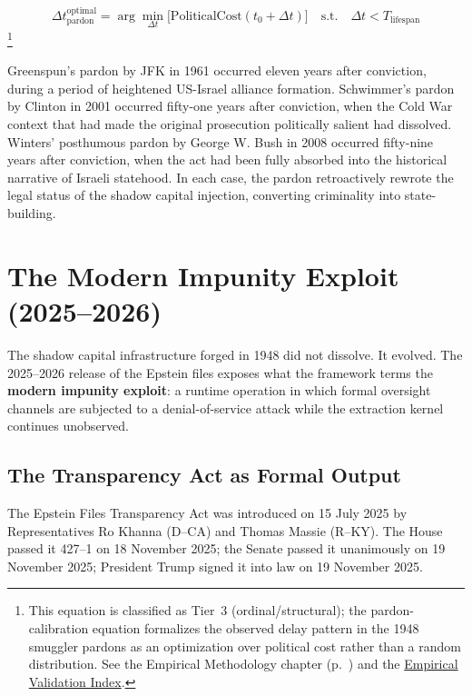 \begin{equation}\label{eq:gp8b-pardon-calibration}
\Delta t_{\text{pardon}}^{\text{optimal}} = \arg\min_{\Delta t} \bigl[ \text{PoliticalCost}(t_0 + \Delta t) \bigr] \quad \text{s.t.} \quad \Delta t < T_{\text{lifespan}}
\end{equation}
\footnote{This equation is classified as Tier~3 (ordinal/structural); the pardon-calibration equation formalizes the observed delay pattern in the 1948 smuggler pardons as an optimization over political cost rather than a random distribution. See the Empirical Methodology chapter (p.~\pageref{ch:empirical_methodology}) and the \hyperref[app:empirical_index]{Empirical Validation Index}.}

Greenspun's pardon by JFK in 1961 occurred eleven years after conviction, during a period of heightened US-Israel alliance formation. Schwimmer's pardon by Clinton in 2001 occurred fifty-one years after conviction, when the Cold War context that had made the original prosecution politically salient had dissolved. Winters' posthumous pardon by George W. Bush in 2008 occurred fifty-nine years after conviction, when the act had been fully absorbed into the historical narrative of Israeli statehood. In each case, the pardon retroactively rewrote the legal status of the shadow capital injection, converting criminality into state-building.

\section{The Modern Impunity Exploit (2025--2026)}

The shadow capital infrastructure forged in 1948 did not dissolve. It evolved. The 2025--2026 release of the Epstein files exposes what the framework terms the \textbf{modern impunity exploit}: a runtime operation in which formal oversight channels are subjected to a denial-of-service attack while the extraction kernel continues unobserved.

\subsection{The Transparency Act as Formal Output}

The Epstein Files Transparency Act was introduced on 15 July 2025 by Representatives Ro Khanna (D--CA) and Thomas Massie (R--KY). The House passed it 427--1 on 18 November 2025; the Senate passed it unanimously on 19 November 2025; President Trump signed it into law on 19 November 2025.


